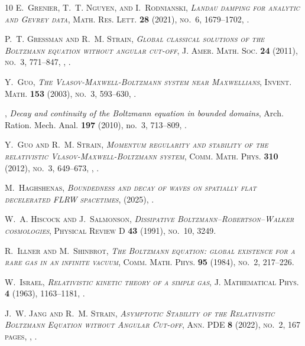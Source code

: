 \documentclass[reqno]{amsart}
\theoremstyle{definition}
\numberwithin{equation}{section}
\numberwithin{theorem}{section}
\begin{document}
\begin{thebibliography}{10}
\bgroup\scshape{}E.~Grenier\egroup{}, \bgroup\scshape{}T.~T. Nguyen\egroup{}, and \bgroup\scshape{}I.~Rodnianski\egroup{}, \emph{Landau damping for analytic and {G}evrey data}, Math. Res. Lett. \textbf{28} (2021), no.~6, 1679--1702, .

\bgroup\scshape{}P.~T. Gressman\egroup{} and \bgroup\scshape{}R.~M. Strain\egroup{}, \emph{Global classical solutions of the {B}oltzmann equation without angular cut-off}, J. Amer. Math. Soc. \textbf{24} (2011), no.~3, 771--847, , .

\bgroup\scshape{}Y.~Guo\egroup{}, \emph{The {V}lasov-{M}axwell-{B}oltzmann system near {M}axwellians}, Invent. Math. \textbf{153} (2003), no.~3, 593--630, .

\bysame, \emph{Decay and continuity of the {B}oltzmann equation in bounded domains}, Arch. Ration. Mech. Anal. \textbf{197} (2010), no.~3, 713--809, .

\bgroup\scshape{}Y.~Guo\egroup{} and \bgroup\scshape{}R.~M. Strain\egroup{}, \emph{Momentum regularity and stability of the relativistic {V}lasov-{M}axwell-{B}oltzmann system}, Comm. Math. Phys. \textbf{310} (2012), no.~3, 649--673, , .

\bgroup\scshape{}M.~Haghshenas\egroup{}, \emph{Boundedness and decay of waves on spatially flat decelerated {FLRW} spacetimes},  (2025), .

\bgroup\scshape{}W.~A. Hiscock\egroup{} and \bgroup\scshape{}J.~Salmonson\egroup{}, \emph{Dissipative {B}oltzmann--{R}obertson--{W}alker cosmologies}, Physical Review D \textbf{43} (1991), no.~10, 3249.

\bgroup\scshape{}R.~Illner\egroup{} and \bgroup\scshape{}M.~Shinbrot\egroup{}, \emph{The {B}oltzmann equation: global existence for a rare gas in an infinite vacuum}, Comm. Math. Phys. \textbf{95} (1984), no.~2, 217--226.

\bgroup\scshape{}W.~Israel\egroup{}, \emph{Relativistic kinetic theory of a simple gas}, J. Mathematical Phys. \textbf{4} (1963), 1163--1181, .

\bgroup\scshape{}J.~W. {J}ang\egroup{} and \bgroup\scshape{}R.~M. {S}train\egroup{}, \emph{{Asymptotic Stability of the Relativistic Boltzmann Equation without Angular Cut-off}}, Ann. {PDE} \textbf{8} (2022), no.~2, 167 pages, , .


\end{thebibliography}
\end{document}
